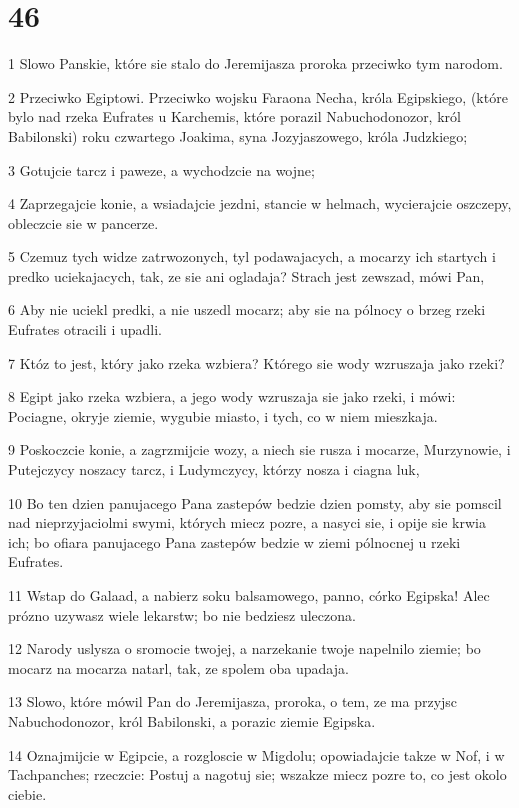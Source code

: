 \chapter{46}

\par 1 Slowo Panskie, które sie stalo do Jeremijasza proroka przeciwko tym narodom.
\par 2 Przeciwko Egiptowi. Przeciwko wojsku Faraona Necha, króla Egipskiego, (które bylo nad rzeka Eufrates u Karchemis, które porazil Nabuchodonozor, król Babilonski) roku czwartego Joakima, syna Jozyjaszowego, króla Judzkiego;
\par 3 Gotujcie tarcz i paweze, a wychodzcie na wojne;
\par 4 Zaprzegajcie konie, a wsiadajcie jezdni, stancie w helmach, wycierajcie oszczepy, obleczcie sie w pancerze.
\par 5 Czemuz tych widze zatrwozonych, tyl podawajacych, a mocarzy ich startych i predko uciekajacych, tak, ze sie ani ogladaja? Strach jest zewszad, mówi Pan,
\par 6 Aby nie uciekl predki, a nie uszedl mocarz; aby sie na pólnocy o brzeg rzeki Eufrates otracili i upadli.
\par 7 Któz to jest, który jako rzeka wzbiera? Którego sie wody wzruszaja jako rzeki?
\par 8 Egipt jako rzeka wzbiera, a jego wody wzruszaja sie jako rzeki, i mówi: Pociagne, okryje ziemie, wygubie miasto, i tych, co w niem mieszkaja.
\par 9 Poskoczcie konie, a zagrzmijcie wozy, a niech sie rusza i mocarze, Murzynowie, i Putejczycy noszacy tarcz, i Ludymczycy, którzy nosza i ciagna luk,
\par 10 Bo ten dzien panujacego Pana zastepów bedzie dzien pomsty, aby sie pomscil nad nieprzyjaciolmi swymi, których miecz pozre, a nasyci sie, i opije sie krwia ich; bo ofiara panujacego Pana zastepów bedzie w ziemi pólnocnej u rzeki Eufrates.
\par 11 Wstap do Galaad, a nabierz soku balsamowego, panno, córko Egipska! Alec prózno uzywasz wiele lekarstw; bo nie bedziesz uleczona.
\par 12 Narody uslysza o sromocie twojej, a narzekanie twoje napelnilo ziemie; bo mocarz na mocarza natarl, tak, ze spolem oba upadaja.
\par 13 Slowo, które mówil Pan do Jeremijasza, proroka, o tem, ze ma przyjsc Nabuchodonozor, król Babilonski, a porazic ziemie Egipska.
\par 14 Oznajmijcie w Egipcie, a rozgloscie w Migdolu; opowiadajcie takze w Nof, i w Tachpanches; rzeczcie: Postuj a nagotuj sie; wszakze miecz pozre to, co jest okolo ciebie.
